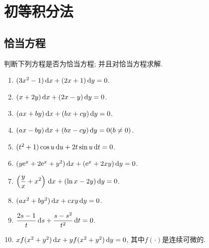 \chapter{初等积分法}
\section{恰当方程}
判断下列方程是否为恰当方程; 并且对恰当方程求解.
\begin{enumerate}[(1)]
\item $(3x^2-1)\,\mathrm{d} x+(2x+1)\,\mathrm{d} y=0$.
\item $(x+2y)\,\mathrm{d} x+(2x-y)\,\mathrm{d} y=0$.
\item $(ax+by)\,\mathrm{d} x+(bx+cy)\,\mathrm{d} y=0$.
\item $(ax-by)\,\mathrm{d} x+(bx-cy)\,\mathrm{d} y=0(b\neq0)$.
\item $(t^2+1)\cos u\,\mathrm{d} u+2t\sin u\,\mathrm{d} t=0$.
\item $(y\mathrm{e}^x+2\mathrm{e}^x+y^2)\,\mathrm{d} x+(\mathrm{e}^x+2xy)\,\mathrm{d} y=0$.
\item $\displaystyle\left(\frac{y}{x}+x^2\right)\,\mathrm{d} x+(\ln x-2y)\,\mathrm{d} y=0$.
\item $(ax^2+by^2)\,\mathrm{d} x+cxy\,\mathrm{d} y=0$.
\item $\displaystyle\frac{2s-1}{t}\,\mathrm{d} s+\frac{s-s^2}{t^2}\,\mathrm{d} t=0$.
\item $xf(x^2+y^2)\,\mathrm{d} x+yf(x^2+y^2)\,\mathrm{d} y=0$, 其中$f(\cdot)$是连续可微的.
\end{enumerate}

